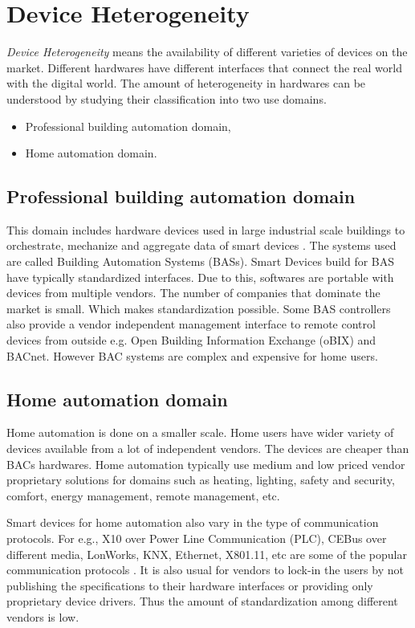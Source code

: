 \section{Device Heterogeneity}
\label{sec:device_heterogeneity_and_portability}

\emph{Device Heterogeneity} means the availability of different varieties of devices on the market. Different hardwares have different interfaces that connect the real world with the digital world. The amount of heterogeneity in hardwares can be understood by studying their classification into two use domains.

\begin{itemize}
  \item Professional building automation domain,
  \item Home automation domain.
\end{itemize}

\subsection*{Professional building automation domain}

This domain includes hardware devices used in large industrial scale buildings to orchestrate, mechanize and aggregate data of smart devices \cite{pahl2014distributed}. The systems used are called Building Automation Systems (BASs). Smart Devices build for BAS have typically standardized interfaces. Due to this, softwares are portable with devices from multiple vendors. The number of companies that dominate the market is small. Which makes standardization possible. Some BAS controllers also provide a vendor independent management interface to remote control devices from outside e.g. Open Building Information Exchange (oBIX) and BACnet. However BAC systems are complex and expensive for home users.

\subsection*{Home automation domain}

Home automation is done on a smaller scale. Home users have wider variety of devices available from a lot of independent vendors. The devices are cheaper than BACs hardwares. Home automation typically use medium and low priced vendor proprietary solutions for domains such as heating, lighting, safety and security, comfort, energy management, remote management, etc.

Smart devices for home automation also vary in the type of communication protocols. For e.g., X10 over Power Line Communication (PLC), CEBus over different media, LonWorks, KNX, Ethernet, X801.11, etc are some of the popular communication protocols \cite{warriach2013state}. It is also usual for vendors to lock-in the users by not publishing the specifications to their hardware interfaces or providing only proprietary device drivers. Thus the amount of standardization among different vendors is low.


